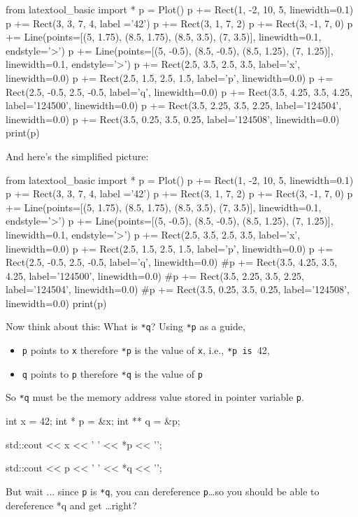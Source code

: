 \begin{python}
from latextool_basic import *
p = Plot()
p += Rect(1, -2, 10, 5, linewidth=0.1)
p += Rect(3, 3, 7, 4, label ='42')
p += Rect(3, 1, 7, 2)
p += Rect(3, -1, 7, 0)
p += Line(points=[(5, 1.75), (8.5, 1.75), (8.5, 3.5), (7, 3.5)], linewidth=0.1, endstyle='>')
p += Line(points=[(5, -0.5), (8.5, -0.5), (8.5, 1.25), (7, 1.25)], linewidth=0.1, endstyle='>')
p += Rect(2.5, 3.5, 2.5, 3.5, label='x', linewidth=0.0)
p += Rect(2.5, 1.5, 2.5, 1.5, label='p', linewidth=0.0)
p += Rect(2.5, -0.5, 2.5, -0.5, label='q', linewidth=0.0)
p += Rect(3.5, 4.25, 3.5, 4.25, label='124500', linewidth=0.0)
p += Rect(3.5, 2.25, 3.5, 2.25, label='124504', linewidth=0.0)
p += Rect(3.5, 0.25, 3.5, 0.25, label='124508', linewidth=0.0)
print(p)
\end{python}

And here's the simplified picture:
\begin{python}
from latextool_basic import *
p = Plot()
p += Rect(1, -2, 10, 5, linewidth=0.1)
p += Rect(3, 3, 7, 4, label ='42')
p += Rect(3, 1, 7, 2)
p += Rect(3, -1, 7, 0)
p += Line(points=[(5, 1.75), (8.5, 1.75), (8.5, 3.5), (7, 3.5)], linewidth=0.1, endstyle='>')
p += Line(points=[(5, -0.5), (8.5, -0.5), (8.5, 1.25), (7, 1.25)], linewidth=0.1, endstyle='>')
p += Rect(2.5, 3.5, 2.5, 3.5, label='x', linewidth=0.0)
p += Rect(2.5, 1.5, 2.5, 1.5, label='p', linewidth=0.0)
p += Rect(2.5, -0.5, 2.5, -0.5, label='q', linewidth=0.0)
#p += Rect(3.5, 4.25, 3.5, 4.25, label='124500', linewidth=0.0)
#p += Rect(3.5, 2.25, 3.5, 2.25, label='124504', linewidth=0.0)
#p += Rect(3.5, 0.25, 3.5, 0.25, label='124508', linewidth=0.0)
print(p)
\end{python}

Now think about this: What is \texttt{*q}? Using \texttt{*p} as a guide,

\begin{itemize}

\item
  \texttt{p} points to \texttt{x} therefore \texttt{*p} is the value of
  \texttt{x}, i.e., \texttt{*p is }42,
\item
  \texttt{q} points to \texttt{p} therefore \texttt{*q} is the value of
  \texttt{p}
\end{itemize}

So \texttt{*q} must be the memory address value stored in pointer variable \texttt{p}.

\begin{consolethree}[escapeinside=||]
int x = 42;
int * p = &x;
int ** q = &p;

std::cout << x << ' ' << *p << '\n';

std::cout << p << ' ' << *q << '\n';
\end{consolethree}
But wait ... since \texttt{p} is \texttt{*q}, you can dereference \texttt{p}\ldots so you should be able to dereference *q and get \ldots right?


